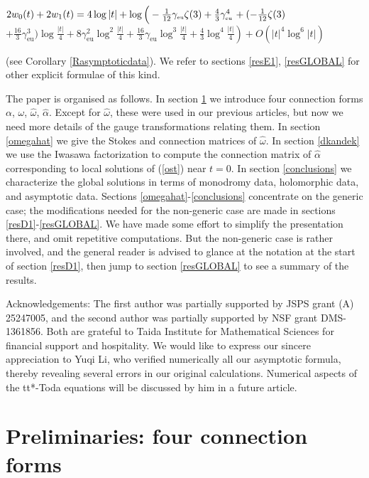 \documentclass[a4paper,12pt,leqno]{amsart}
\numberwithin{equation}{section}
\theoremstyle{plain}
\theoremstyle{definition}
\newcommand{\al}{\alpha}
\newcommand{\om}{\omega}
\newcommand{\no}{\noindent}
\newcommand{\euler}{\gamma_{\scriptscriptstyle\text{eu}}}
\begin{document}
\no
$
2w_0(t)+2w_1(t)= 4\log\vert t\vert + 
\log 
\left(
\vphantom{\log\tfrac{\vert t\vert}{4}}
-\tfrac1{12}\euler\zeta(3) +\tfrac43\euler^4
\right.
+(-\tfrac1{12}\zeta(3) 
$
\newline
$
\left.
+\tfrac{16}3\euler^3)\log\tfrac{\vert t\vert}{4}
+8\euler^2\log^2\tfrac{\vert t\vert}{4}
+\tfrac{16}3\euler\log^3\tfrac{\vert t\vert}{4}
+\tfrac43\log^4\tfrac{\vert t\vert}{4}
\right)
+O(\vert t\vert^4 \log^6\vert t\vert)
$

\no
(see Corollary \ref{Rasymptoticdata}).
We refer to sections \ref{resE1}, \ref{resGLOBAL} for other explicit formulae of this kind.

 The paper is organised as follows. In section \ref{four} we introduce four connection forms 
$\al$, $\om$, $\hat\om$, $\hat\al$.  Except for $\hat\om$, these were used in our previous articles, but now we need more details of the gauge transformations relating them.   In section \ref{omegahat}
we give the Stokes and connection matrices of $\hat\om$.   In section \ref{dkandek} we use the Iwasawa factorization to compute the connection matrix of $\hat\al$ corresponding to local solutions of (\ref{ost}) near $t=0$.  In section \ref{conclusions} we characterize the global solutions in terms of monodromy data, holomorphic data, and asymptotic data.   Sections
\ref{omegahat}-\ref{conclusions} concentrate on the generic case; the modifications needed for the non-generic case are made in sections  
\ref{resD1}-\ref{resGLOBAL}. We have made some effort to simplify the presentation there, and omit repetitive computations. But the non-generic case is rather involved, and the general reader is advised to glance at the notation at the start of section \ref{resD1}, then jump to section \ref{resGLOBAL} to see a summary of the results.

Acknowledgements:   
The first author was partially supported by JSPS grant (A) 25247005, and the second author was partially supported by NSF grant  DMS-1361856.  Both are grateful to Taida Institute for Mathematical Sciences for financial support and hospitality.  We would like to express our sincere appreciation to Yuqi Li, who verified numerically all our asymptotic formula, thereby revealing several errors in our original calculations.
Numerical aspects of the tt*-Toda equations will be discussed by him in a future article.


\section{Preliminaries:  four connection forms}\label{four}
\end{document}
